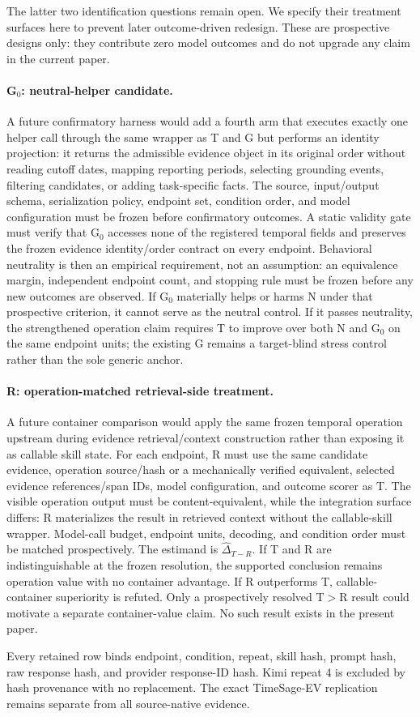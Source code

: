The latter two identification questions remain open. We specify their treatment surfaces here to prevent later outcome-driven redesign. These are prospective designs only: they contribute zero model outcomes and do not upgrade any claim in the current paper.

\paragraph{G$_0$: neutral-helper candidate.}
A future confirmatory harness would add a fourth arm that executes exactly one helper call through the same wrapper as T and G but performs an identity projection: it returns the admissible evidence object in its original order without reading cutoff dates, mapping reporting periods, selecting grounding events, filtering candidates, or adding task-specific facts. The source, input/output schema, serialization policy, endpoint set, condition order, and model configuration must be frozen before confirmatory outcomes. A static validity gate must verify that G$_0$ accesses none of the registered temporal fields and preserves the frozen evidence identity/order contract on every endpoint. Behavioral neutrality is then an empirical requirement, not an assumption: an equivalence margin, independent endpoint count, and stopping rule must be frozen before any new outcomes are observed. If G$_0$ materially helps or harms N under that prospective criterion, it cannot serve as the neutral control. If it passes neutrality, the strengthened operation claim requires T to improve over both N and G$_0$ on the same endpoint units; the existing G remains a target-blind stress control rather than the sole generic anchor.

\paragraph{R: operation-matched retrieval-side treatment.}
A future container comparison would apply the same frozen temporal operation upstream during evidence retrieval/context construction rather than exposing it as callable skill state. For each endpoint, R must use the same candidate evidence, operation source/hash or a mechanically verified equivalent, selected evidence references/span IDs, model configuration, and outcome scorer as T. The visible operation output must be content-equivalent, while the integration surface differs: R materializes the result in retrieved context without the callable-skill wrapper. Model-call budget, endpoint units, decoding, and condition order must be matched prospectively. The estimand is $\widehat{\Delta}_{T-R}$. If T and R are indistinguishable at the frozen resolution, the supported conclusion remains operation value with no container advantage. If R outperforms T, callable-container superiority is refuted. Only a prospectively resolved T$>$R result could motivate a separate container-value claim. No such result exists in the present paper.

Every retained row binds endpoint, condition, repeat, skill hash, prompt hash, raw response hash, and provider response-ID hash. Kimi repeat 4 is excluded by hash provenance with no replacement. The exact TimeSage-EV replication remains separate from all source-native evidence.
